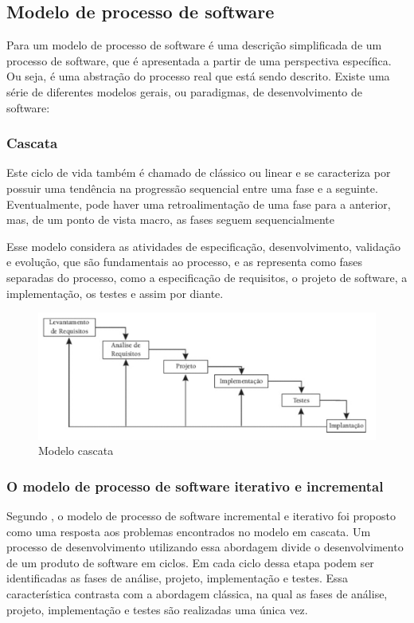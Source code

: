 \subsection{Modelo de processo de software}

Para  um modelo de processo de software é uma descrição simplificada de um processo de software, que é apresentada a partir de uma perspectiva específica. Ou seja, é uma abstração do processo real que está sendo descrito. Existe uma série de diferentes modelos gerais, ou paradigmas, de desenvolvimento de
software:

\subsubsection{Cascata}
Este ciclo de vida também é chamado de clássico ou linear e se caracteriza por possuir uma tendência na progressão sequencial entre uma fase e a seguinte. Eventualmente, pode haver uma retroalimentação de uma fase para a anterior, mas, de um ponto de vista macro, as fases seguem sequencialmente \cite{bezerra2016principios}

Esse modelo considera as atividades de especificação, desenvolvimento, validação e evolução, que são fundamentais ao processo, e as representa como fases separadas do processo, como a especificação de requisitos, o projeto de software, a implementação, os testes e assim por diante.

\begin{figure}[H]
	\centering
	\includegraphics[scale=0.4]{imagens/cascata.png}
	\caption{Modelo cascata \cite{bezerra2016principios}}
	\label{fig:modelo-cascata}
\end{figure}

\subsubsection{O modelo de processo de software iterativo e incremental}

Segundo  , o modelo de processo de software incremental e iterativo foi proposto como uma resposta aos problemas encontrados no modelo em cascata. Um processo de desenvolvimento utilizando essa abordagem divide o desenvolvimento de um produto de software em ciclos. Em cada ciclo dessa etapa podem ser identificadas as fases de análise, projeto, implementação e testes. Essa característica contrasta com a abordagem clássica, na qual as fases de análise, projeto, implementação e testes são realizadas uma única vez.

